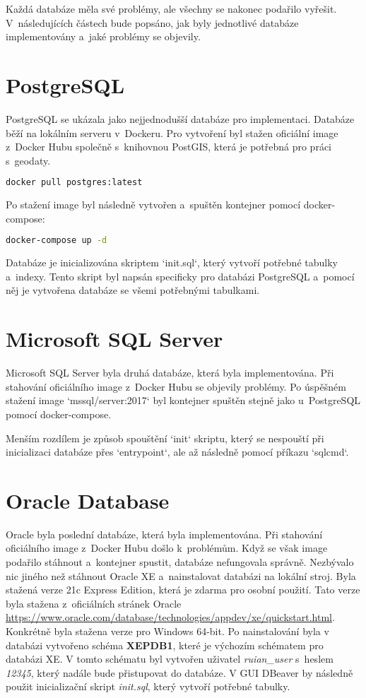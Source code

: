 Každá databáze měla své problémy, ale všechny se nakonec podařilo vyřešit.  
V~následujících částech bude popsáno, jak byly jednotlivé databáze implementovány a~jaké problémy se objevily.

\section{PostgreSQL}
PostgreSQL se ukázala jako nejjednodušší databáze pro implementaci.  
Databáze běží na lokálním serveru v~Dockeru.  
Pro vytvoření byl stažen oficiální image z~Docker Hubu  
společně s~knihovnou PostGIS, která je potřebná pro práci s~geodaty.

\begin{lstlisting}[language=bash]
docker pull postgres:latest
\end{lstlisting}

Po stažení image byl následně vytvořen a~spuštěn kontejner pomocí docker-compose:

\begin{lstlisting}[language=bash]
docker-compose up -d
\end{lstlisting}

Databáze je inicializována skriptem `init.sql`, který vytvoří potřebné tabulky a~indexy.  
Tento skript byl napsán specificky pro databázi PostgreSQL a~pomocí něj je vytvořena databáze  
se všemi potřebnými tabulkami.

\section{Microsoft SQL Server}
Microsoft SQL Server byla druhá databáze, která byla implementována.  
Při stahování oficiálního image z~Docker Hubu se objevily problémy.  
Po úspěšném stažení image `mssql/server:2017` byl kontejner spuštěn stejně jako u~PostgreSQL  
pomocí docker-compose.

Menším rozdílem je způsob spouštění `init` skriptu, který se nespouští při inicializaci databáze  
přes `entrypoint`, ale až následně pomocí příkazu `sqlcmd`.

\newpage

\section{Oracle Database}
Oracle byla poslední databáze, která byla implementována.  
Při stahování oficiálního image z~Docker Hubu došlo k~problémům.  
Když se však image podařilo stáhnout a~kontejner spustit, databáze nefungovala správně.  
Nezbývalo nic jiného než stáhnout Oracle XE a~nainstalovat databázi na lokální stroj.  
Byla stažená verze 21c Express Edition, která je zdarma pro osobní použití.
Tato verze byla stažena z~oficiálních stránek Oracle 
\url{https://www.oracle.com/database/technologies/appdev/xe/quickstart.html}.
Konkrétně byla stažena verze pro Windows 64-bit.
Po nainstalování byla v databázi vytvořeno schéma \textbf{XEPDB1}, které je výchozím 
schématem pro databázi XE. V tomto schématu byl vytvořen uživatel \textit{ruian\_user} s~heslem \textit{12345},
který nadále bude přistupovat do databáze.
V GUI DBeaver by následně použit inicializační skript \textit{init.sql}, 
který vytvoří potřebné tabulky.


